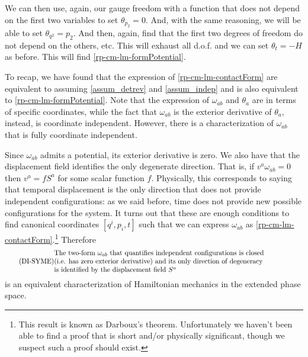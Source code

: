 We can then use, again, our gauge freedom with a function that does not depend on the first two variables to set $\theta_{p_2} = 0$. And, with the same reasoning, we will be able to set $\theta_{q^2} = p_2$. And then, again, find that the first two degrees of freedom do not depend on the others, etc. This will exhaust all d.o.f. and we can set $\theta_t = -H$ as before. This will find \ref{rp-cm-lm-formPotential}.

To recap, we have found that the expression of \ref{rp-cm-lm-contactForm} are equivalent to assuming \ref{assum_detrev} and \ref{assum_indep} and is also equivalent to \ref{rp-cm-lm-formPotential}. Note that the expression of $\omega_{ab}$ and $\theta_a$ are in terms of specific coordinates, while the fact that $\omega_{ab}$ is the exterior derivative of $\theta_a$, instead, is coordinate independent. However, there is a characterization of $\omega_{ab}$ that is fully coordinate independent.

Since $\omega_{ab}$ admits a potential, its exterior derivative is zero. We also have that the displacement field identifies the only degenerate direction. That is, if $v^a\omega_{ab} = 0$ then $v^a = f S^a$ for some scalar function $f$. Physically, this corresponds to saying that temporal displacement is the only direction that does not provide independent configurations: as we said before, time does not provide new possible configurations for the system. It turns out that these are enough conditions to find canonical coordinates $[ q^i, p_i, t]$ such that we can express $\omega_{ab}$ as \ref{rp-cm-lm-contactForm}.\footnote{This result is known as Darboux's theorem. Unfortunately we haven't been able to find a proof that is short and/or physically significant, though we suspect such a proof should exist.} Therefore
\begin{equation}\label{rp-cm-lm-condSymplecticFormDef}
	\tag{DI-SYME}
	\parbox{5in}{The two-form $\omega_{ab}$ that quantifies independent configurations is closed \\ (i.e. has zero exterior derivative)  and its only direction of degeneracy \\ is identified by the displacement field $S^a$}
\end{equation}
is an equivalent characterization of Hamiltonian mechanics in the extended phase space.

